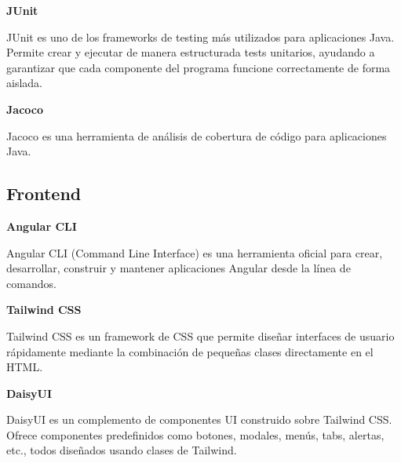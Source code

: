 \textbf{JUnit}

JUnit\cite{junit:official} es uno de los frameworks de testing más utilizados para aplicaciones Java.
Permite crear y ejecutar de manera estructurada tests unitarios, ayudando a garantizar que cada componente del
programa funcione correctamente de forma aislada.

\textbf{Jacoco}

Jacoco\cite{jacoco:official} es una herramienta de análisis de cobertura de código para aplicaciones Java.

\subsection{Frontend}\label{subsec:librerias_frontend}



\textbf{Angular CLI}

Angular CLI (Command Line Interface)\cite{angularcli:official} es una herramienta oficial para crear, desarrollar,
construir y mantener aplicaciones Angular desde la línea de comandos.


\textbf{Tailwind CSS}

Tailwind CSS\cite{tailwind:official} es un framework de CSS que permite diseñar interfaces de usuario
rápidamente mediante la combinación de pequeñas clases directamente en el HTML.


\textbf{DaisyUI}

DaisyUI\cite{daisyui:official} es un complemento de componentes UI construido sobre Tailwind CSS. Ofrece componentes
predefinidos como botones, modales, menús, tabs, alertas, etc., todos diseñados usando clases de Tailwind.



